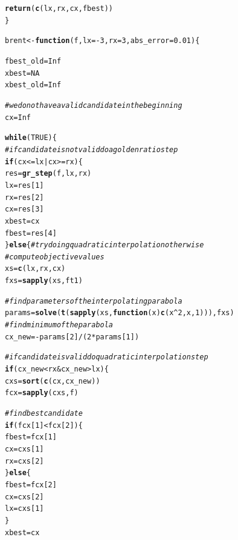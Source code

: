 \documentclass[a4paper]{article}
\makeatletter
\newcommand{\hlnum}[1]{\textcolor[rgb]{0.686,0.059,0.569}{#1}}%
\newcommand{\hlcom}[1]{\textcolor[rgb]{0.678,0.584,0.686}{\textit{#1}}}%
\newcommand{\hlopt}[1]{\textcolor[rgb]{0,0,0}{#1}}%
\newcommand{\hlstd}[1]{\textcolor[rgb]{0.345,0.345,0.345}{#1}}%
\newcommand{\hlkwa}[1]{\textcolor[rgb]{0.161,0.373,0.58}{\textbf{#1}}}%
\newcommand{\hlkwb}[1]{\textcolor[rgb]{0.69,0.353,0.396}{#1}}%
\newcommand{\hlkwc}[1]{\textcolor[rgb]{0.333,0.667,0.333}{#1}}%
\newcommand{\hlkwd}[1]{\textcolor[rgb]{0.737,0.353,0.396}{\textbf{#1}}}%
\newenvironment{kframe}{%
 \def\at@end@of@kframe{}%
 \ifinner\ifhmode%
  \def\at@end@of@kframe{\end{minipage}}%
  \begin{minipage}{\columnwidth}%
 \fi\fi%
 \def\FrameCommand##1{\hskip\@totalleftmargin \hskip-\fboxsep
 \colorbox{shadecolor}{##1}\hskip-\fboxsep
     \hskip-\linewidth \hskip-\@totalleftmargin \hskip\columnwidth}%
 \MakeFramed {\advance\hsize-\width
   \@totalleftmargin\z@ \linewidth\hsize
   \@setminipage}}%
 {\par\unskip\endMakeFramed%
 \at@end@of@kframe}
\newenvironment{knitrout}{}{} %
\makeatother
\begin{document}
{\begin{enumerate}
\begin{knitrout}
\begin{kframe}
\begin{alltt}
  \hlkwd{return}\hlstd{(}\hlkwd{c}\hlstd{(lx, rx, cx, fbest))}
\hlstd{\}}

\hlstd{brent} \hlkwb{<-} \hlkwa{function}\hlstd{(}\hlkwc{f}\hlstd{,} \hlkwc{lx} \hlstd{=} \hlopt{-}\hlnum{3}\hlstd{,} \hlkwc{rx} \hlstd{=} \hlnum{3}\hlstd{,} \hlkwc{abs_error} \hlstd{=} \hlnum{0.01}\hlstd{)\{}

  \hlstd{fbest_old} \hlkwb{=} \hlnum{Inf}
  \hlstd{xbest} \hlkwb{=} \hlnum{NA}
  \hlstd{xbest_old} \hlkwb{=} \hlnum{Inf}

  \hlcom{# we do not have a valid candidate in the beginning}
  \hlstd{cx} \hlkwb{=} \hlnum{Inf}

  \hlkwa{while}\hlstd{(}\hlnum{TRUE}\hlstd{)\{}
    \hlcom{# if candidate is not valid do a golden ratio step}
    \hlkwa{if}\hlstd{(cx} \hlopt{<=} \hlstd{lx} \hlopt{|} \hlstd{cx} \hlopt{>=} \hlstd{rx)\{}
      \hlstd{res} \hlkwb{=} \hlkwd{gr_step}\hlstd{(f, lx, rx)}
      \hlstd{lx} \hlkwb{=} \hlstd{res[}\hlnum{1}\hlstd{]}
      \hlstd{rx} \hlkwb{=} \hlstd{res[}\hlnum{2}\hlstd{]}
      \hlstd{cx} \hlkwb{=} \hlstd{res[}\hlnum{3}\hlstd{]}
      \hlstd{xbest} \hlkwb{=} \hlstd{cx}
      \hlstd{fbest} \hlkwb{=} \hlstd{res[}\hlnum{4}\hlstd{]}
    \hlstd{\}}\hlkwa{else}\hlstd{\{} \hlcom{# try doing quadratic interpolation otherwise}
      \hlcom{# compute objective values}
      \hlstd{xs} \hlkwb{=} \hlkwd{c}\hlstd{(lx, rx, cx)}
      \hlstd{fxs} \hlkwb{=} \hlkwd{sapply}\hlstd{(xs, ft1)}

      \hlcom{# find parameters of the interpolating parabola}
      \hlstd{params} \hlkwb{=} \hlkwd{solve}\hlstd{(}\hlkwd{t}\hlstd{(}\hlkwd{sapply}\hlstd{(xs,} \hlkwa{function}\hlstd{(}\hlkwc{x}\hlstd{)} \hlkwd{c}\hlstd{(x}\hlopt{^}\hlnum{2}\hlstd{, x,} \hlnum{1}\hlstd{))), fxs)}
      \hlcom{# find minimum of the parabola}
      \hlstd{cx_new} \hlkwb{=} \hlopt{-}\hlstd{params[}\hlnum{2}\hlstd{]}\hlopt{/}\hlstd{(}\hlnum{2}\hlopt{*}\hlstd{params[}\hlnum{1}\hlstd{])}

      \hlcom{# if candidate is valid do quadratic interpolation step}
      \hlkwa{if}\hlstd{(cx_new} \hlopt{<} \hlstd{rx} \hlopt{&} \hlstd{cx_new} \hlopt{>} \hlstd{lx)\{}
        \hlstd{cxs} \hlkwb{=} \hlkwd{sort}\hlstd{(}\hlkwd{c}\hlstd{(cx, cx_new))}
        \hlstd{fcx} \hlkwb{=} \hlkwd{sapply}\hlstd{(cxs, f)}

        \hlcom{# find best candidate}
        \hlkwa{if} \hlstd{(fcx[}\hlnum{1}\hlstd{]} \hlopt{<} \hlstd{fcx[}\hlnum{2}\hlstd{])\{}
          \hlstd{fbest} \hlkwb{=} \hlstd{fcx[}\hlnum{1}\hlstd{]}
          \hlstd{cx} \hlkwb{=} \hlstd{cxs[}\hlnum{1}\hlstd{]}
          \hlstd{rx} \hlkwb{=} \hlstd{cxs[}\hlnum{2}\hlstd{]}
        \hlstd{\}}\hlkwa{else}\hlstd{\{}
          \hlstd{fbest} \hlkwb{=} \hlstd{fcx[}\hlnum{2}\hlstd{]}
          \hlstd{cx} \hlkwb{=} \hlstd{cxs[}\hlnum{2}\hlstd{]}
          \hlstd{lx} \hlkwb{=} \hlstd{cxs[}\hlnum{1}\hlstd{]}
        \hlstd{\}}
        \hlstd{xbest} \hlkwb{=} \hlstd{cx}


\end{alltt}
\end{kframe}
\end{knitrout}
\end{enumerate}}
\end{document}
